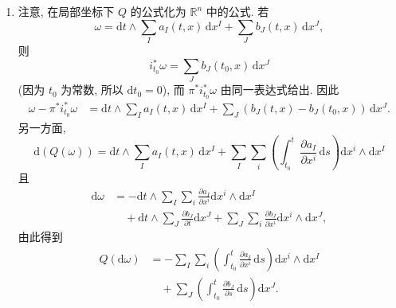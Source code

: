 \begin{description}[font=\normalfont,leftmargin=2em,labelwidth=1.5em]
\begin{enumerate}[label=(\alph*),ref=\alph*,leftmargin=*]
\begin{align*}
  \widetilde f^*(Q(\omega))
  &=\widetilde f^*(\widetilde\psi^{-1})^*(Q(\widetilde\psi^*\omega))
  =(\widetilde\psi^{-1}\circ\widetilde f)^*(Q(\widetilde\psi^*\omega))\\
  &=(\widetilde{\widehat f}\circ\widetilde\varphi^{-1})^*(Q(\widetilde\psi^*\omega))
  =(\widetilde\varphi^{-1})^*\widetilde{\widehat f}^{\,*}(Q(\widetilde\psi^*\omega))\\
  &=(\widetilde\varphi^{-1})^*(Q(\widetilde{\widehat f}^{\,*}(\widetilde\psi^*\omega)))
  =(\widetilde\varphi^{-1})^*(Q((\widetilde\psi\circ\widetilde{\widehat f})^*\omega))\\
  &=(\widetilde\varphi^{-1})^*(Q((\widetilde f\circ\widetilde\varphi)^*\omega))
  =(\widetilde\varphi^{-1})^*(Q(\widetilde\varphi^*\widetilde f^*\omega))\\
  &=Q(\widetilde f^*\omega).
\end{align*}
类似地, $M$ 上 $Q$ 的线性性由 $\mathbb{R}^n$ 上 $Q$ 的线性性得出.
\item 注意, 在局部坐标下 $Q$ 的公式化为 $\mathbb{R}^n$ 中的公式. 若
\[
  \omega=\mathrm{d}t\wedge\sum_I a_I(t,x)\,\mathrm{d}x^I+\sum_J b_J(t,x)\,\mathrm{d}x^J,
\]
则
\[
  i_{t_0}^*\omega=\sum_J b_J(t_0,x)\,\mathrm{d}x^J
\]
(因为 $t_0$ 为常数, 所以 $\mathrm{d}t_0=0$), 而 $\pi^*i_{t_0}^*\omega$ 由同一表达式给出. 因此
\begin{align*}
  \omega-\pi^*i_{t_0}^*\omega
  &=\mathrm{d}t\wedge\sum_I a_I(t,x)\,\mathrm{d}x^I
    +\sum_J(b_J(t,x)-b_J(t_0,x))\,\mathrm{d}x^J.
\end{align*}
另一方面,
\[
  \mathrm{d}(Q(\omega))=\mathrm{d}t\wedge\sum_I a_I(t,x)\,\mathrm{d}x^I
    +\sum_I\sum_i\left(\int_{t_0}^t\frac{\partial a_I}{\partial x^i}\,\mathrm{d}s\right)\mathrm{d}x^i\wedge\mathrm{d}x^I
\]
且
\begin{align*}
  \mathrm{d}\omega
  &=-\mathrm{d}t\wedge\sum_I\sum_i\frac{\partial a_I}{\partial x^i}\mathrm{d}x^i\wedge\mathrm{d}x^I\\
  &\quad+\mathrm{d}t\wedge\sum_J\frac{\partial b_J}{\partial t}\mathrm{d}x^J
       +\sum_J\sum_i\frac{\partial b_J}{\partial x^i}\mathrm{d}x^i\wedge\mathrm{d}x^J,
\end{align*}
由此得到
\begin{align*}
  Q(\mathrm{d}\omega)
  &=-\sum_I\sum_i\left(\int_{t_0}^t\frac{\partial a_I}{\partial x^i}\,\mathrm{d}s\right)\mathrm{d}x^i\wedge\mathrm{d}x^I\\
  &\quad+\sum_J\left(\int_{t_0}^t\frac{\partial b_J}{\partial s}\,\mathrm{d}s\right)\mathrm{d}x^J.
\end{align*}

\end{enumerate}
\end{description}
